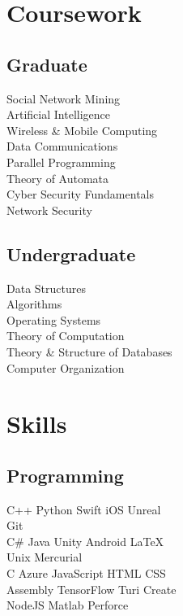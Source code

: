 \documentclass[]{deedy_resume}
\begin{document}
\begin{minipage}[t]{0.33\textwidth}

\section{Coursework}
\subsection{Graduate}
Social Network Mining \\
Artificial Intelligence \\
Wireless \& Mobile Computing \\
Data Communications \\
Parallel Programming \\
Theory of Automata \\
Cyber Security Fundamentals \\
Network Security \\
\sectionsep

\subsection{Undergraduate}
Data Structures \\
Algorithms \\
Operating Systems \\
Theory of Computation \\
Theory \& Structure of Databases \\
Computer Organization \\
\sectionsep


\section{Skills}
\subsection{Programming}
C++ \textbullet{} Python \textbullet{} Swift \textbullet{} iOS \textbullet{} Unreal \\
\textbullet{} Git \\
C\# \textbullet{} Java \textbullet{} Unity \textbullet{} Android \textbullet{} \LaTeX\ \\
Unix \textbullet{} Mercurial \\
C \textbullet{} Azure \textbullet{} JavaScript \textbullet{} HTML\textbullet{} CSS \\ Assembly \textbullet{} TensorFlow \textbullet{} Turi Create \\ NodeJS \textbullet{} Matlab \textbullet{} Perforce \\
\sectionsep

%
%

\end{minipage} 
\end{document}
